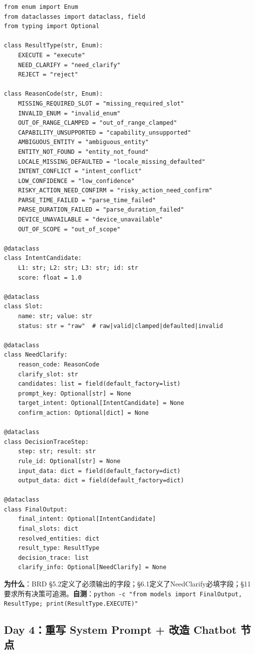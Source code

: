 \documentclass[12pt,a4paper]{ctexart}
\begin{document}
{\small
\begin{verbatim}
from enum import Enum
from dataclasses import dataclass, field
from typing import Optional

class ResultType(str, Enum):
    EXECUTE = "execute"
    NEED_CLARIFY = "need_clarify"
    REJECT = "reject"

class ReasonCode(str, Enum):
    MISSING_REQUIRED_SLOT = "missing_required_slot"
    INVALID_ENUM = "invalid_enum"
    OUT_OF_RANGE_CLAMPED = "out_of_range_clamped"
    CAPABILITY_UNSUPPORTED = "capability_unsupported"
    AMBIGUOUS_ENTITY = "ambiguous_entity"
    ENTITY_NOT_FOUND = "entity_not_found"
    LOCALE_MISSING_DEFAULTED = "locale_missing_defaulted"
    INTENT_CONFLICT = "intent_conflict"
    LOW_CONFIDENCE = "low_confidence"
    RISKY_ACTION_NEED_CONFIRM = "risky_action_need_confirm"
    PARSE_TIME_FAILED = "parse_time_failed"
    PARSE_DURATION_FAILED = "parse_duration_failed"
    DEVICE_UNAVAILABLE = "device_unavailable"
    OUT_OF_SCOPE = "out_of_scope"

@dataclass
class IntentCandidate:
    L1: str; L2: str; L3: str; id: str
    score: float = 1.0

@dataclass
class Slot:
    name: str; value: str
    status: str = "raw"  # raw|valid|clamped|defaulted|invalid

@dataclass
class NeedClarify:
    reason_code: ReasonCode
    clarify_slot: str
    candidates: list = field(default_factory=list)
    prompt_key: Optional[str] = None
    target_intent: Optional[IntentCandidate] = None
    confirm_action: Optional[dict] = None

@dataclass
class DecisionTraceStep:
    step: str; result: str
    rule_id: Optional[str] = None
    input_data: dict = field(default_factory=dict)
    output_data: dict = field(default_factory=dict)

@dataclass
class FinalOutput:
    final_intent: Optional[IntentCandidate]
    final_slots: dict
    resolved_entities: dict
    result_type: ResultType
    decision_trace: list
    clarify_info: Optional[NeedClarify] = None
\end{verbatim}
}

\textbf{为什么}：BRD §5.2定义了必须输出的字段；§6.1定义了NeedClarify必填字段；§11要求所有决策可追溯。\textbf{自测}：\texttt{python -c "from models import FinalOutput, ResultType; print(ResultType.EXECUTE)"}

\newpage

\subsection{Day 4：重写 System Prompt + 改造 Chatbot 节点}
\end{document}
